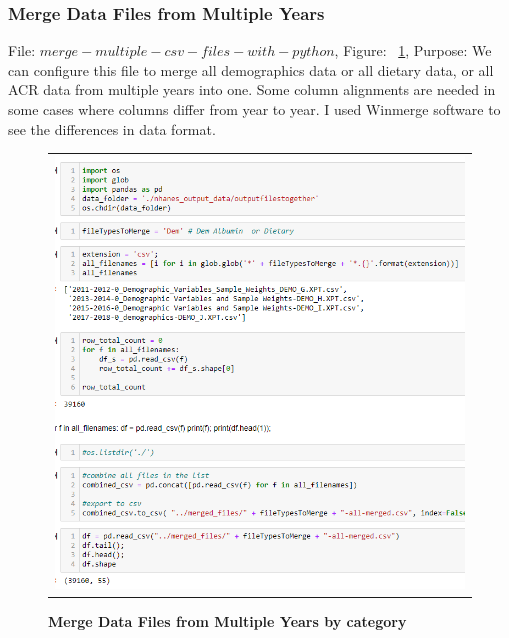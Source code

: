 \subsubsection{Merge Data Files from Multiple Years }
File: $merge-multiple-csv-files-with-python$, Figure: ~\ref{merge-data-files}, Purpose: We can configure this file to merge all demographics data or all dietary data, or all ACR data from multiple years into one. Some column alignments are needed in some cases where columns differ from year to year. I used Winmerge software to see the differences in data format.
\begin{figure}[!htb]
\begin{tabular}{c}
\includegraphics[scale=1]{images/datasetgenerationcode/merge-demographics-files.png} \\
\end{tabular}
\caption{\textbf{Merge Data Files from Multiple Years by category}}
\label{merge-data-files}
\vspace{0.25cm}
\end{figure}


